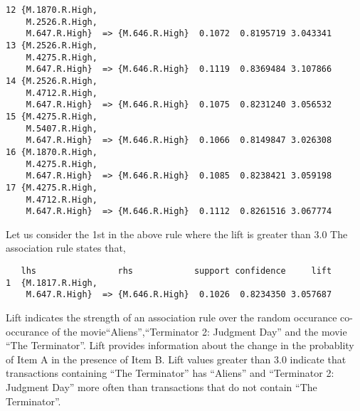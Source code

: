 \documentclass[a4paper,20pt]{article}
\begin{document}
\begin{verbatim}
12 {M.1870.R.High,                                              
    M.2526.R.High,                                              
    M.647.R.High}  => {M.646.R.High}  0.1072  0.8195719 3.043341
13 {M.2526.R.High,                                              
    M.4275.R.High,                                              
    M.647.R.High}  => {M.646.R.High}  0.1119  0.8369484 3.107866
14 {M.2526.R.High,                                              
    M.4712.R.High,                                              
    M.647.R.High}  => {M.646.R.High}  0.1075  0.8231240 3.056532
15 {M.4275.R.High,                                              
    M.5407.R.High,                                              
    M.647.R.High}  => {M.646.R.High}  0.1066  0.8149847 3.026308
16 {M.1870.R.High,                                              
    M.4275.R.High,                                              
    M.647.R.High}  => {M.646.R.High}  0.1085  0.8238421 3.059198
17 {M.4275.R.High,                                              
    M.4712.R.High,                                              
    M.647.R.High}  => {M.646.R.High}  0.1112  0.8261516 3.067774
\end{verbatim}

Let us consider the 1st in the above rule where the lift is greater than 3.0
The association rule states that,
\begin{verbatim}
   lhs                rhs            support confidence     lift
1  {M.1817.R.High,                                              
    M.647.R.High}  => {M.646.R.High}  0.1026  0.8234350 3.057687
\end{verbatim}

Lift indicates the strength of an association rule over the random
occurance co-occurance of the movie\newline``Aliens'',``Terminator 2: Judgment Day'' and the movie ``The Terminator''. Lift provides information about the change in the
probablity of Item A in the presence of Item B. Lift values greater than 3.0 indicate that transactions
containing ``The Terminator'' has ``Aliens'' and ``Terminator 2: Judgment Day'' more often than transactions
that do not contain ``The Terminator''.
\end{document}
